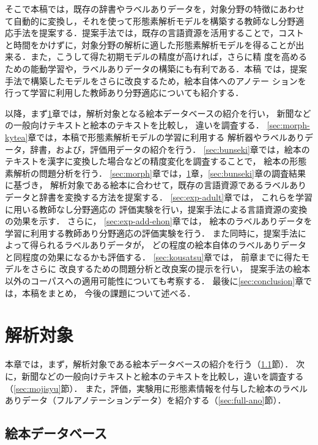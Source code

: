 \documentclass[japanese]{jnlp_1.4}
\begin{document}
そこで本稿では，既存の辞書やラベルありデータを，対象分野の特徴にあわせ
て自動的に変換し，それを使って形態素解析モデルを構築する教師なし分野適
応手法を提案する．提案手法では，既存の言語資源を活用することで，コスト
と時間をかけずに，対象分野の解析に適した形態素解析モデルを得ることが出
来る．また，こうして得た初期モデルの精度が高ければ，さらに精
度を高めるための能動学習や，ラベルありデータの構築にも有利である．本稿
では，提案手法で構築したモデルをさらに改良するため，絵本自体へのアノテー
ションを行って学習に利用した教師あり分野適応についても紹介する．


以降，まず\ref{sec:target}章では，解析対象となる絵本データベースの紹介を行い，
新聞などの一般向けテキストと絵本のテキストを比較し，
違いを調査する．
\ref{sec:morph-kytea}章では，本稿で形態素解析モデルの学習に利用する
解析器やラベルありデータ，辞書，および，評価用データの紹介を行う．
\ref{sec:bunseki}章では，絵本のテキストを漢字に変換した場合などの精度変化を調査することで，
絵本の形態素解析の問題分析を行う．
\ref{sec:morph}章では，\ref{sec:target}章，\ref{sec:bunseki}章の調査結果に基づき，
解析対象である絵本に合わせて，既存の言語資源であるラベルありデータと辞書を変換する方法を提案する．
\ref{sec:exp-adult}章では，
これらを学習に用いる教師なし分野適応の
評価実験を行い，提案手法による言語資源の変換の効果を示す．
さらに，
\ref{sec:exp-add-ehon}章では，
絵本のラベルありデータを学習に利用する教師あり分野適応の評価実験を行う．
また同時に，提案手法によって得られるラベルありデータが，
どの程度の絵本自体のラベルありデータと同程度の効果になるかも評価する．
\ref{sec:kousatsu}章では，
前章までに得たモデルをさらに
改良するための問題分析と改良案の提示を行い，
提案手法の絵本以外のコーパスへの適用可能性についても考察する．
最後に\ref{sec:conclusion}章では，本稿をまとめ，
今後の課題について述べる．


\section{解析対象}
\label{sec:target}

本章では，まず，解析対象である絵本データベースの紹介を行う（\ref{sec:ehon-db}節）．
次に，新聞などの一般向けテキストと絵本のテキストを比較し，違いを調査する（\ref{sec:mojisyu}節）．
また，評価，実験用に形態素情報を付与した絵本のラベルありデータ（フルアノテーションデータ）を紹介する（\ref{sec:full-ano}節）．


\subsection{絵本データベース}
\label{sec:ehon-db}
\end{document}
